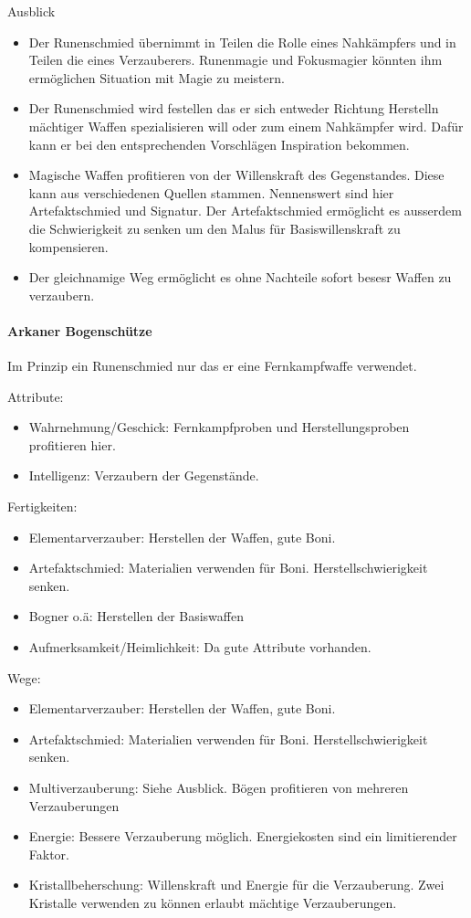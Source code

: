 \documentclass{article}
\begin{document}
Ausblick
\begin{itemize}
\item Der Runenschmied übernimmt in Teilen die Rolle eines Nahkämpfers und in Teilen die eines Verzauberers. Runenmagie und Fokusmagier könnten ihm ermöglichen Situation mit Magie zu meistern.
\item Der Runenschmied wird festellen das er sich entweder Richtung Herstelln mächtiger Waffen spezialisieren will oder zum einem Nahkämpfer wird. Dafür kann er bei den entsprechenden Vorschlägen Inspiration bekommen.
\item Magische Waffen profitieren von der Willenskraft des Gegenstandes. Diese kann aus verschiedenen Quellen stammen. Nennenswert sind hier Artefaktschmied und Signatur. Der Artefaktschmied ermöglicht es ausserdem die Schwierigkeit zu senken um den Malus für Basiswillenskraft zu kompensieren.
\item Der gleichnamige Weg ermöglicht es ohne Nachteile sofort besesr Waffen zu verzaubern.
\end{itemize}

\paragraph{Arkaner Bogenschütze}
Im Prinzip ein Runenschmied nur das er eine Fernkampfwaffe verwendet.

Attribute:
\begin{itemize}
\item Wahrnehmung/Geschick: Fernkampfproben und Herstellungsproben profitieren hier.
\item Intelligenz: Verzaubern der Gegenstände.
\end{itemize}

Fertigkeiten:
\begin{itemize}
\item Elementarverzauber: Herstellen der Waffen, gute Boni.
\item Artefaktschmied: Materialien verwenden für Boni. Herstellschwierigkeit senken.
\item Bogner o.ä: Herstellen der Basiswaffen
\item Aufmerksamkeit/Heimlichkeit: Da gute Attribute vorhanden.
\end{itemize}

Wege:
\begin{itemize}
\item Elementarverzauber: Herstellen der Waffen, gute Boni.
\item Artefaktschmied: Materialien verwenden für Boni. Herstellschwierigkeit senken.
\item Multiverzauberung: Siehe Ausblick. Bögen profitieren von mehreren Verzauberungen
\item Energie: Bessere Verzauberung möglich. Energiekosten sind ein limitierender Faktor.
\item Kristallbeherschung: Willenskraft und Energie für die Verzauberung. Zwei Kristalle verwenden zu können erlaubt mächtige Verzauberungen.
\end{itemize}
\end{document}
